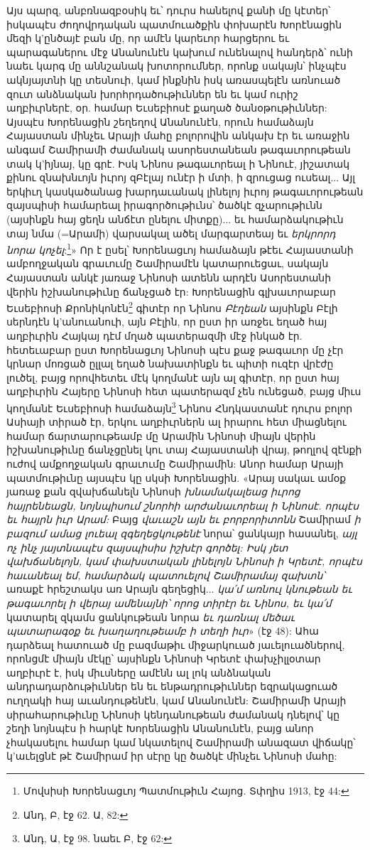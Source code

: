 \documentclass{article}
\begin{document}
{Այս պարզ, անբռնազբօսիկ եւ՝ դուրս հանելով քանի մը կէտեր՝ իսկապէս ժողովրդական պատմուածքին փոխարէն Խորէնացին մեզի կ'ընծայէ բան մը, որ ամէն կարեւոր հարցերու եւ պարագաներու մէջ Անանունէն կախում ունենալով հանդերձ՝ ունի նաեւ կարգ մը աննշանակ խոտորումներ, որոնք սակայն՝ ինչպէս ակնյայտնի կը տեսնուի, կամ ինքնին իսկ առասպելէն առնուած զուտ անձնական խորհրդածութիւններ են եւ կամ ուրիշ աղբիւրներէ, օր. համար Եւսեբիոսէ քաղած ծանօթութիւններ: Այսպէս Խորենացին շեղեղով Անանունէն, որուն համաձայն Հայաստան մինչեւ Արայի մահը բոլորովին անկախ էր եւ առաջին անգամ Շամիրամի ժամանակ ասորեստանեան թագաւորութեան տակ կ'իյնայ, կը գրէ. Իսկ Նինոս թագաւորեալ ի Նինուէ, յիշատակ քինու զնախնւոյն իւրոյ զԲէլայ ունէր ի մտի, ի զրուցաց ուսեալ... Այլ երկիւղ կասկածանաց խարդաւանակ լինելոյ իւրոյ թագաւորութեան զայսպիսի համարեալ իրագործութիւնս՝ ծածկէ զչարութիւնն (այսինքն հայ ցեղն անճէտ ընելու միտքը)... եւ համարձակութիւն տայ նմա (=Արամի) վարսակալ ածել մարգարտեայ եւ \emph{երկրորդ նորա կոչել}:\footnote{Մովսիսի Խորենացւոյ Պատմութիւն Հայոց. Տփղիս 1913, էջ 44:}» Որ է ըսել՝ Խորենացւոյ համաձայն թէեւ Հայաստանի ամբողջական գրաւումը Շամիրամէն կատարուեցաւ, սակայն Հայաստան անկէ յառաջ Նինոսի ատենն արդէն Ասորեստանի վերին իշխանութիւնը ճանչցած էր: Խորենացին գլխաւորաբար Եւսեբիոսի Քրոնիկոնէն\footnote{Անդ, Բ, էջ 62. Ա, 82:} գիտէր որ Նինոս \emph{Բէղեան} այսինքն Բէլի սերնդէն կ'անուանուի, այն Բէլին, որ ըստ իր առջեւ եղած հայ աղբիւրին Հայկայ դէմ մղած պատերազմի մէջ ինկած էր. հետեւաբար ըստ Խորենացւոյ Նինոսի պէս քաջ թագաւոր մը չէր կրնար մոռցած ըլլալ եղած նախատինքն եւ պիտի ուզէր վրէժը լուծել, բայց որովհետեւ մէկ կողմանէ այն ալ գիտէր, որ ըստ հայ աղբիւրին Հայերը Նինոսի հետ պատերազմ չեն ունեցած, բայց միւս կողմանէ Եւսեբիոսի համաձայն\footnote{Անդ, Ա, էջ 98. նաեւ Բ, էջ 62:} Նինոս Հնդկաստանէ դուրս բոլոր Ասիայի տիրած էր, երկու աղբիւրներն ալ իրարու հետ միացնելու համար ճարտարութեամբ մը Արամին Նինոսի միայն վերին իշխանութիւնը ճանչցընել կու տայ Հայաստանի վրայ, թողլով զէնքի ուժով ամքողջական գրաւումը Շամիրամին: Անոր համար Արայի պատմութիւնը այսպէս կը սկսի Խորենացին. «Արայ սակաւ ամօք յառաջ քան զվախճանելն Նինոսի \emph{խնամակալեաց իւրոց հայրենեացն, նոյնպիսում շնորհի արժանաւորեալ ի Նինոսէ. որպէս եւ հայրն իւր Արամ:} Բայց \emph{վաւաշն այն եւ բորբորիտոնն} Շամիրամ \emph{ի բազում ամաց լուեալ զգեղեցկութենէ} նորա՝ ցանկայր հասանել, \emph{այլ ոչ ինչ յայտնապէս զայսպիսիս իշխէր գործել: Իսկ յետ վախճանելոյն, կամ փախստական լինելոյն Նինոսի ի Կրետէ, որպէս հաւանեալ եմ, համարձակ պատուելով Շամիրամայ զախտն՝} առաքէ հրեշտակս առ Արայն գեղեցիկ... \emph{կա՛մ առնուլ կնութեան եւ թագաւորել ի վերայ ամենայնի՝ որոց տիրէր եւ Նինոս, եւ կա՛մ} կատարել զկամս ցանկութեան նորա \emph{եւ դառնալ մեծաւ պատարագօք եւ խաղաղութեամբ ի տեղի իւր}» (էջ 48): Ահա դարձեալ հատուած մը բազմաթիւ միջարկուած յաւելուածներով, որոնցմէ միայն մէկը՝ այսինքն Նինոսի Կրետէ փախչիլլօտար աղբիւրէ է, իսկ միւսները ամէնն ալ լոկ անձնական անդրադարձութիւններ են եւ ենթադրութիւններ եզրակացուած ուղղակի հայ աւանդութենէն, կամ Անանունէն: Շամիրամի Արայի սիրահարութիւնը Նինոսի կենդանութեան ժամանակ դնելով՝ կը շեղի նոյնպէս ի հարկէ Խորենացին Անանունէն, բայց անոր չհակասելու համար կամ նկատելով Շամիրամի անազատ վիճակը՝ կ'աւելցնէ թէ Շամիրամ իր սէրը կը ծածկէ մինչեւ Նինոսի մահը:

}
\end{document}
